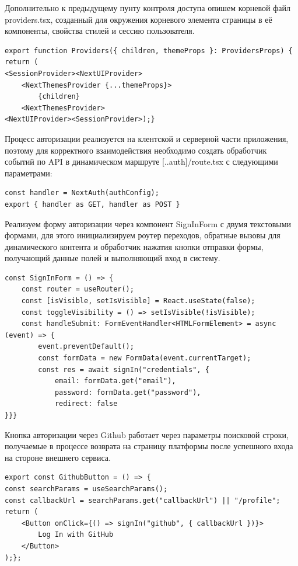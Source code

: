 \documentclass[master, och, diploma]{SCWorks}
\begin{document}
Дополнительно к предыдущему пунту контроля доступа опишем корневой файл providers.tsx, созданный для окружения корневого элемента страницы в её компоненты, свойства стилей и сессию пользователя.
\begin{verbatim}
export function Providers({ children, themeProps }: ProvidersProps) {
return (
<SessionProvider><NextUIProvider>
    <NextThemesProvider {...themeProps}>
        {children}
    <NextThemesProvider>
<NextUIProvider><SessionProvider>);}    
\end{verbatim}

Процесс авторизации реализуется на клентской и серверной части приложения, поэтому для корректного взаимодействия необходимо создать обработчик событий по API в динамическом маршруте [..auth]/route.tsx с следующими параметрами:
\begin{verbatim}
const handler = NextAuth(authConfig);
export { handler as GET, handler as POST }
\end{verbatim}

Реализуем форму авторизации через компонент SignInForm с двумя текстовыми формами, для этого инициализируем роутер переходов, обратные вызовы для динамического контента и обработчик нажатия кнопки отправки формы, получающий данные полей и выполняющий вход в систему.
\begin{verbatim}
const SignInForm = () => {
    const router = useRouter();
    const [isVisible, setIsVisible] = React.useState(false);
    const toggleVisibility = () => setIsVisible(!isVisible);
    const handleSubmit: FormEventHandler<HTMLFormElement> = async (event) => {
        event.preventDefault();
        const formData = new FormData(event.currentTarget);
        const res = await signIn("credentials", {
            email: formData.get("email"),
            password: formData.get("password"),
            redirect: false
}}}
\end{verbatim}

Кнопка авторизации через Github работает через параметры поисковой строки, получаемые в процессе возврата на страницу платформы после успешного входа на стороне внешнего сервиса.
\begin{verbatim}
export const GithubButton = () => {
const searchParams = useSearchParams();
const callbackUrl = searchParams.get("callbackUrl") || "/profile";
return (
    <Button onClick={() => signIn("github", { callbackUrl })}>        
        Log In with GitHub
    </Button>
);};
\end{verbatim}
\end{document}
